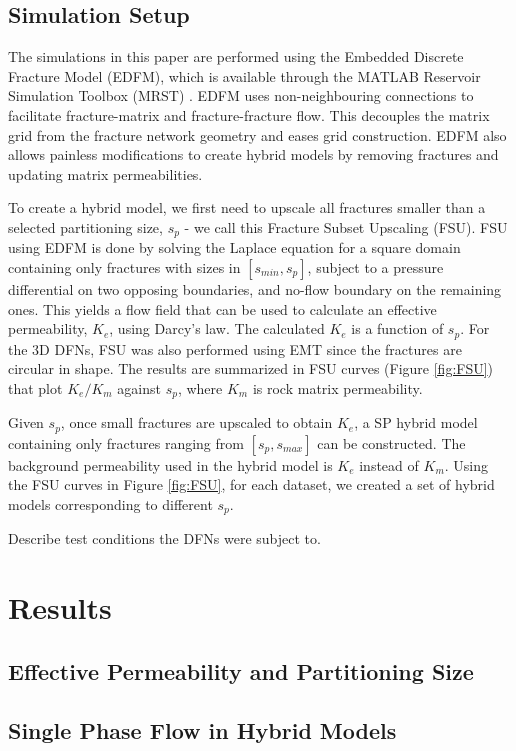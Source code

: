 \documentclass[a4paper]{article}
\begin{document}
\subsection{Simulation Setup}
The simulations in this paper are performed using the Embedded Discrete Fracture Model (EDFM), which is available through the MATLAB Reservoir Simulation Toolbox (MRST) \citep{Lee2001, Lie2015, Moinfar2013}. EDFM uses non-neighbouring connections to facilitate fracture-matrix and fracture-fracture flow. This decouples the matrix grid from the fracture network geometry and eases grid construction. EDFM also allows painless modifications to create hybrid models by removing fractures and updating matrix permeabilities.

To create a hybrid model, we first need to upscale all fractures smaller than a selected partitioning size, $s_p$ - we call this Fracture Subset Upscaling (FSU). FSU using EDFM is done by solving the Laplace equation for a square domain containing only fractures with sizes in $[s_{min},s_p]$, subject to a pressure differential on two opposing boundaries, and no-flow boundary on the remaining ones. This yields a flow field that can be used to calculate an effective permeability, $K_{e}$, using Darcy's law. The calculated $K_{e}$ is a function of $s_p$. For the 3D DFNs, FSU was also performed using EMT since the fractures are circular in shape. The results are summarized in FSU curves (Figure \ref{fig:FSU}) that plot $K_{e}/K_m$ against $s_p$, where $K_m$ is rock matrix permeability.

Given $s_p$, once small fractures are upscaled to obtain $K_e$, a SP hybrid model containing only fractures ranging from $[s_p,s_{max}]$ can be constructed. The background permeability used in the hybrid model is $K_e$ instead of $K_m$. Using the FSU curves in Figure \ref{fig:FSU}, for each dataset, we created a set of hybrid models corresponding to different $s_p$. 

Describe test conditions the DFNs were subject to.

\section{Results}
\subsection{Effective Permeability and Partitioning Size}


\subsection{Single Phase Flow in Hybrid Models}

\end{document}
